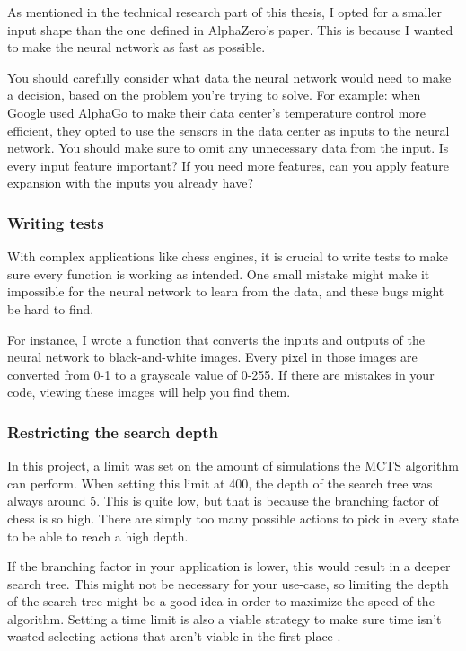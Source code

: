 \documentclass{article}
\begin{document}
As mentioned in the technical research part of this thesis, I opted for a smaller input
shape than the one defined in AlphaZero's paper. This is because I wanted to make the 
neural network as fast as possible. 

You should carefully consider what data the neural network would need to make a decision, 
based on the problem you're trying to solve. For example: when Google used AlphaGo to make
their data center's temperature control more efficient, they opted to use the sensors in the
data center as inputs to the neural network. 
You should make sure to omit any unnecessary data from the input. Is every input feature important?
If you need more features, can you apply feature expansion with the inputs you already have?

\subsubsection{Writing tests}

With complex applications like chess engines, it is crucial to write tests to make sure
every function is working as intended. One small mistake might make it impossible for the 
neural network to learn from the data, and these bugs might be hard to find.

For instance, I wrote a function that converts the inputs and outputs of the neural network
to black-and-white images. Every pixel in those images are converted from 0-1 to a grayscale value of 0-255.
If there are mistakes in your code, viewing these images will help you find them.

\subsubsection{Restricting the search depth}

In this project, a limit was set on the amount of simulations the MCTS algorithm can perform.
When setting this limit at 400, the depth of the search tree was always around 5. This is quite low,
but that is because the branching factor of chess is so high. There are simply too many possible actions
to pick in every state to be able to reach a high depth.  

If the branching factor in your application is lower, this would result in a deeper search tree.
This might not be necessary for your use-case, so limiting the depth of the search tree might be a good idea
in order to maximize the speed of the algorithm. Setting a time limit is also a viable strategy 
to make sure time isn't wasted selecting actions that aren't viable in the first place \cite{masonAnswerHowWe2019}.
\end{document}
